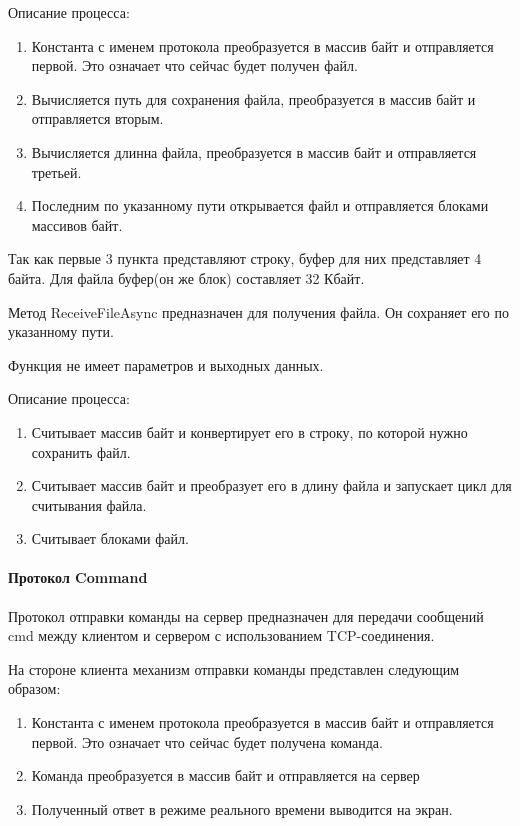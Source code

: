 Описание процесса:
\begin{enumerate}
	\item Константа с именем протокола преобразуется в массив байт и отправляется первой. Это означает что сейчас будет получен файл.
	\item Вычисляется путь для сохранения файла, преобразуется в массив байт и отправляется вторым.
	\item Вычисляется длинна файла, преобразуется в массив байт и отправляется третьей.
	\item Последним по указанному пути открывается файл и отправляется блоками массивов байт.
\end{enumerate}

Так как первые 3 пункта представляют строку, буфер для них представляет 4 байта. Для файла буфер(он же блок) составляет 32 Кбайт.

Метод ReceiveFileAsync предназначен для получения файла. Он сохраняет его по указанному пути.

Функция не имеет параметров и выходных данных.

Описание процесса:
\begin{enumerate}
	\item Считывает массив байт и конвертирует его в строку, по которой нужно сохранить файл.
	\item Считывает массив байт и преобразует его в длину файла и запускает цикл для считывания файла.
	\item Считывает блоками файл.
\end{enumerate}

\paragraph {Протокол Command}
Протокол отправки команды на сервер предназначен для передачи сообщений cmd между клиентом и сервером с использованием TCP-соединения. 

На стороне клиента механизм отправки команды представлен следующим образом:
\begin{enumerate}
	\item Константа с именем протокола преобразуется в массив байт и отправляется первой. Это означает что сейчас будет получена команда.
	\item Команда преобразуется в массив байт и отправляется на сервер
	\item Полученный ответ в режиме реального времени выводится на экран.
\end{enumerate}

